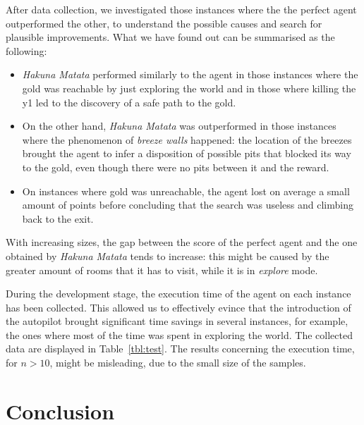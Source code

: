\documentclass{llncs}
\newcommand{\hm}{\emph{Hakuna Matata}\xspace}
\begin{document}
After data collection, we investigated those instances where the the perfect agent outperformed the other, to understand the possible causes and search for plausible improvements.
What we have found out can be summarised as the following:
\begin{itemize}
	\item \hm performed similarly to the agent in those instances where the gold was reachable by just exploring the world and in those where killing the y1 led to the discovery of a safe path to the gold.
	\item On the other hand, \hm was outperformed in those instances where the phenomenon of \emph{breeze walls} happened: the location of the breezes brought the agent to infer a disposition of possible pits that blocked its way to the gold, even though there were no pits between it and the reward.
	\item On instances where gold was unreachable, the agent lost on average a small amount of points before concluding that the search was useless and climbing back to the exit.
\end{itemize}

With increasing sizes, the gap between the score of the perfect agent and the one obtained by \hm tends to increase: this might be caused by the greater amount of rooms that it has to visit, while it is in \emph{explore} mode.

During the development stage, the execution time of the agent on each instance has been collected.
This allowed us to effectively evince that the introduction of the autopilot brought significant time savings in several instances, for example, the ones where most of the time was spent in exploring the world.
The collected data are displayed in Table~\ref{tbl:test}.
The results concerning the execution time, for $n > 10$, might be misleading, due to the small size of the samples.

\section{Conclusion}
\end{document}
